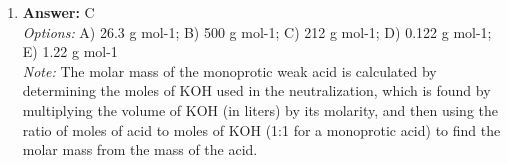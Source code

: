 \documentclass[12pt]{article}
\begin{document}
\begin{enumerate}[label=\arabic*.]
\\ \textit{Note:} The correct answer of 3.82 g is derived from the stoichiometry of the Wurtz reaction, where 10.0 g of n-propyl chloride (C$_{3}$H$_{7}$Cl) reacts to form hexane (C$_{6}$H$_{14}$) with a theoretical yield of 5.46 g, and after accounting for the 70\% yield, the actual mass produced is calculated as 5.46 g x 0.70 = 3.82 g.
\item \textbf{Answer:} C
\\ \textit{Options:} A) 26.3 g mol-1; B) 500 g mol-1; C) 212 g mol-1; D) 0.122 g mol-1; E) 1.22 g mol-1
\\ \textit{Note:} The molar mass of the monoprotic weak acid is calculated by determining the moles of KOH used in the neutralization, which is found by multiplying the volume of KOH (in liters) by its molarity, and then using the ratio of moles of acid to moles of KOH (1:1 for a monoprotic acid) to find the molar mass from the mass of the acid.
\end{enumerate}
\end{document}
